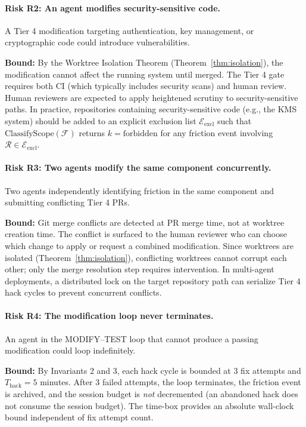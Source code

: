 \documentclass[11pt]{article}
\begin{document}
\paragraph{Risk R2: An agent modifies security-sensitive code.}
A Tier 4 modification targeting authentication, key management, or cryptographic
code could introduce vulnerabilities.

\textbf{Bound:} By the Worktree Isolation Theorem (Theorem~\ref{thm:isolation}),
the modification cannot affect the running system until merged. The Tier 4 gate
requires both CI (which typically includes security scans) and human review.
Human reviewers are expected to apply heightened scrutiny to security-sensitive
paths. In practice, repositories containing security-sensitive code (e.g., the
KMS system) should be added to an explicit exclusion list $\mathcal{E}_{\text{excl}}$
such that $\text{ClassifyScope}(\mathcal{F})$ returns $k = \text{forbidden}$ for
any friction event involving $\mathcal{R} \in \mathcal{E}_{\text{excl}}$.

\paragraph{Risk R3: Two agents modify the same component concurrently.}
Two agents independently identifying friction in the same component and
submitting conflicting Tier 4 PRs.

\textbf{Bound:} Git merge conflicts are detected at PR merge time, not at
worktree creation time. The conflict is surfaced to the human reviewer who
can choose which change to apply or request a combined modification. Since
worktrees are isolated (Theorem~\ref{thm:isolation}), conflicting worktrees
cannot corrupt each other; only the merge resolution step requires intervention.
In multi-agent deployments, a distributed lock on the target repository path
can serialize Tier 4 hack cycles to prevent concurrent conflicts.

\paragraph{Risk R4: The modification loop never terminates.}
An agent in the MODIFY--TEST loop that cannot produce a passing modification
could loop indefinitely.

\textbf{Bound:} By Invariants 2 and 3, each hack cycle is bounded at 3 fix
attempts and $T_{\text{hack}} = 5$ minutes. After 3 failed attempts, the loop
terminates, the friction event is archived, and the session budget is
\emph{not} decremented (an abandoned hack does not consume the session budget).
The time-box provides an absolute wall-clock bound independent of fix attempt
count.
\end{document}
